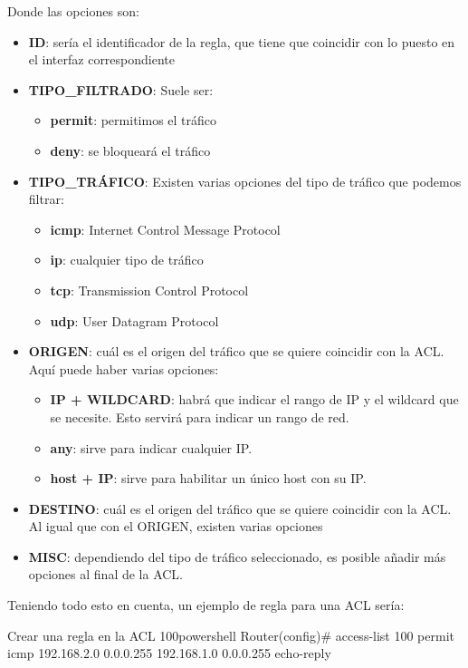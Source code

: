 Donde las opciones son:
\begin{itemize}
    \item \textbf{ID}: sería el identificador de la regla, que tiene que coincidir con lo puesto en el interfaz correspondiente
    \item \textbf{TIPO\_FILTRADO}: Suele ser:
    \begin{itemize}
    \item \textbf{permit}: permitimos el tráfico
    \item \textbf{deny}: se bloqueará el tráfico
    \end{itemize}
    \item \textbf{TIPO\_TRÁFICO}: Existen varias opciones del tipo de tráfico que podemos filtrar:
    \begin{itemize}
        \item \textbf{icmp}: Internet Control Message Protocol
        \item \textbf{ip}: cualquier tipo de tráfico
        \item \textbf{tcp}: Transmission Control Protocol
        \item \textbf{udp}: User Datagram Protocol
    \end{itemize}
    \item \textbf{ORIGEN}: cuál es el origen del tráfico que se quiere coincidir con la ACL. Aquí puede haber varias opciones:
    \begin{itemize}
        \item \textbf{IP + WILDCARD}: habrá que indicar el rango de IP y el wildcard que se necesite. Esto servirá para indicar un rango de red.
        \item \textbf{any}: sirve para indicar cualquier IP.
        \item \textbf{host + IP}: sirve para habilitar un único host con su IP.
    \end{itemize}
    \item \textbf{DESTINO}: cuál es el origen del tráfico que se quiere coincidir con la ACL. Al igual que con el ORIGEN, existen varias opciones
    \item \textbf{MISC}: dependiendo del tipo de tráfico seleccionado, es posible añadir más opciones al final de la ACL.
\end{itemize}


Teniendo todo esto en cuenta, un ejemplo de regla para una ACL sería:

\begin{mycode}{Crear una regla en la ACL 100}{powershell}{{\scriptsize }}
Router(config)# access-list 100 permit icmp 192.168.2.0 0.0.0.255 192.168.1.0 0.0.0.255 echo-reply
\end{mycode}

